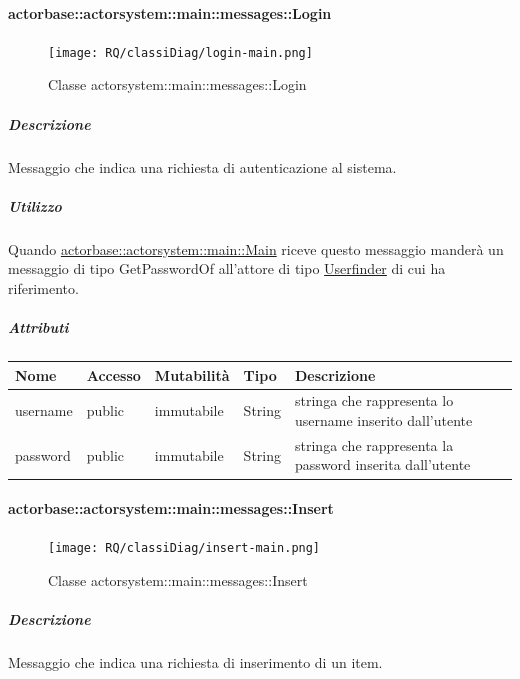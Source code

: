 \documentclass{scalatekids-article}
\begin{document}
\paragraph{actorbase::actorsystem::main::messages::Login}
\label{sec:actorbase::actorsystem::main::messages::Login}

\begin{figure}[H]
  \begin{center}
    \texttt{[image: RQ/classiDiag/login-main.png]}
    \caption{Classe actorsystem::main::messages::Login}
  \end{center}
\end{figure}

\subparagraph{Descrizione}
Messaggio che indica una richiesta di autenticazione al sistema.

\subparagraph{Utilizzo}
Quando \hyperref[sec:actorbase::actorsystem::main::Main]{actorbase::actorsystem::main::Main}
riceve questo messaggio manderà un messaggio di tipo GetPasswordOf
all'attore di tipo \hyperref[sec:actorbase::actorsystem::userfinder::Userfinder]{Userfinder} di cui ha riferimento.

\subparagraph{Attributi}
\begin{tabular}{| p{3cm} | p{1.5cm} | p{2cm} | p{2cm} | p{8.5cm} |}
  \hline
  Nome & Accesso & Mutabilità & Tipo & Descrizione\\
  \hline
  username & public & immutabile & String & stringa che rappresenta lo username inserito dall'utente \\
  \hline
  password & public & immutabile & String & stringa che rappresenta la password inserita dall'utente \\
  \hline
\end{tabular}

\paragraph{actorbase::actorsystem::main::messages::Insert}
\label{sec:actorbase::actorsystem::main::messages::Insert}

\begin{figure}[H]
  \begin{center}
    \texttt{[image: RQ/classiDiag/insert-main.png]}
    \caption{Classe actorsystem::main::messages::Insert}
  \end{center}
\end{figure}

\subparagraph{Descrizione}
Messaggio che indica una richiesta di inserimento di un item.
\end{document}
